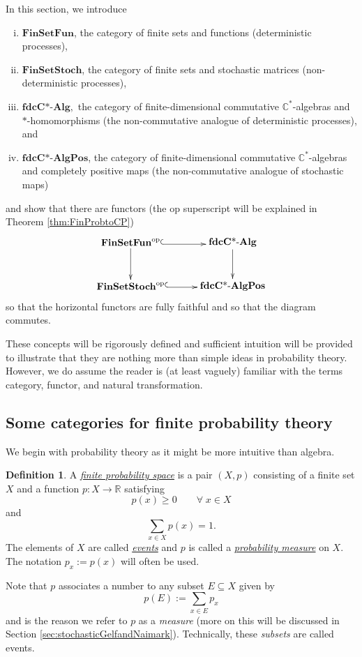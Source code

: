 \documentclass[12pt]{article}
\theoremstyle{theorem}
\theoremstyle{definition}
\newtheorem{definition}[equation]{Definition}
\numberwithin{equation}{section}
\let\C=\Chi \let\W=\Omega
\newcommand{\be}{\begin{equation}}
\newcommand{\ee}{\end{equation}}
\newcommand{\bd}{\begin{definition}}
\newcommand{\ed}{\end{definition}}
\newcommand{\<}{\langle}
\renewcommand{\>}{\rangle}
\def\R{{{\mathbb R}}}
\def\C{{{\mathbb C}}}
\newcommand{\fdcCAlg}{\mathbf{fdcC\text{*-}Alg}}
\newcommand{\fdcCAlgPos}{\mathbf{fdcC\text{*-}AlgPos}}
\newcommand{\FinSetFun}{\mathbf{FinSetFun}}
\newcommand{\FinSetStoch}{\mathbf{FinSetStoch}}
\newcommand{\op}{\mathrm{op}}
\begin{document}
In this section, we introduce
\begin{enumerate}[i.]
\item
$\FinSetFun$, the category of finite sets and functions (deterministic processes),
\item
$\FinSetStoch$, the category of finite sets and stochastic matrices 
(non-deterministic processes),
\item
$\fdcCAlg,$ the category of finite-dimensional commutative $\C^*$-algebras 
and $*$-homomorphisms 
(the non-commutative analogue of deterministic processes), and 
\item
$\fdcCAlgPos$, the category of finite-dimensional commutative 
$\C^*$-algebras and completely positive maps 
(the non-commutative analogue of stochastic maps)
\end{enumerate}
and show that there are functors (the 
$\op$ superscript will be explained in 
Theorem \ref{thm:FinProbtoCP})
\be
\xy0;/r.25pc/:
(-17.5,7.5)*+{\FinSetFun^{\op}}="FinProb";
(-17.5,-7.5)*+{\FinSetStoch^{\op}}="FinStoch";
(17.5,7.5)*+{\fdcCAlg}="states";
(17.5,-7.5)*+{\fdcCAlgPos}="CPstates";
{\ar@{^{(}->}@<-0.5ex>"FinProb";"states"};
{\ar@{^{(}->}@<-0.3ex>"FinStoch";"CPstates"};
{\ar"FinProb";"FinStoch"};
{\ar"states";"CPstates"};
\endxy
\ee
so that the horizontal functors are fully faithful and so that the diagram 
commutes. 

These concepts will be rigorously defined and sufficient intuition
will be provided to illustrate that they are nothing more than 
simple ideas in probability theory. 
However, we do assume the reader is (at least vaguely) familiar with the terms
category, functor, and natural transformation.


\subsection{Some categories for finite probability theory}

We begin with probability theory as it might be more intuitive than algebra.

\bd
A \emph{\uline{finite probability space}} is a pair $(X,p)$ consisting of 
a finite set $X$ and a function $p:X\to\R$ satisfying
\be
p(x)\ge0\qquad\forall\;x\in X
\ee
and
\be
\sum_{x\in X}p(x)=1.
\ee
The elements of $X$ are called \emph{\uline{events}} 
and $p$ is called a \emph{\uline{probability measure}} on $X.$
The notation $p_{x}:=p(x)$ will often be used. 
\ed

Note that $p$ associates a number to any subset $E\subseteq X$ given by 
\be
p(E):=\sum_{x\in E}p_{x}
\ee
and is the reason we refer to $p$ as a \emph{measure}
(more on this will be discussed in Section \ref{sec:stochasticGelfandNaimark}).
Technically, these \emph{subsets} are called events.
\end{document}
